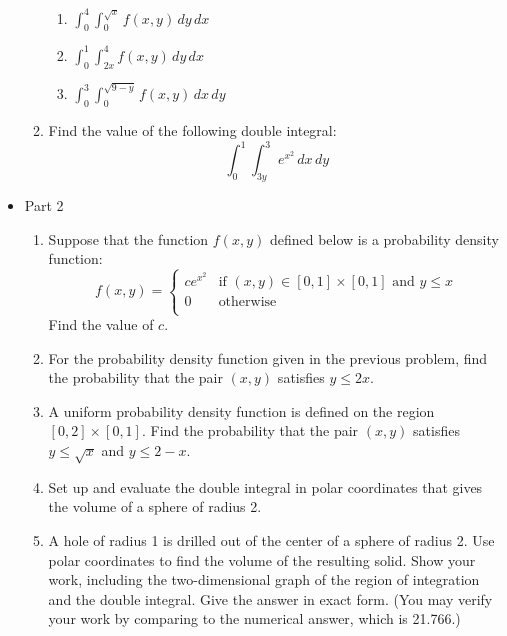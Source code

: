 \documentclass{article}
\begin{document}
\begin{itemize}
\begin{enumerate}
\begin{enumerate}
                     \item $\displaystyle \int_0^4\int_{0}^{\sqrt{x}} f(x,y)\,dy\,dx$
                     \item $\displaystyle \int_0^1\int_{2x}^4 f(x,y)\,dy\,dx$
                    \item $\displaystyle \int_0^3\int_0^{\sqrt{9-y}}f(x,y)\,dx\,dy$
                    \end{enumerate}
                    \item Find the value of the following double integral:
                    $$\int_0^1\int_{3y}^{3}e^{x^2}\,dx\,dy$$
                \end{enumerate} 
            \item Part 2
                \begin{enumerate}
                    \item Suppose that the function $f(x,y)$ defined below is a probability density function:
                    $$ f(x,y) = \begin{cases} 
                        ce^{x^2} & \text{if } (x,y) \in [0,1]\times [0,1] \text{ and } y \leq x\\
                        0 & \text{otherwise} \\
                        \end{cases}
                    $$
                    Find the value of $c$.
                    \item For the probability density function given in the previous problem, find the probability that the pair $(x,y)$ satisfies $y \leq 2x$.
                    \item A uniform probability density function is defined on the region $[0,2]\times[0,1]$. Find the probability that the pair $(x,y)$ satisfies $y \leq \sqrt{x}$ and $y \leq 2-x$.
                    \item Set up and evaluate the double integral in polar coordinates that gives the volume of a sphere of radius 2.

                    \item A hole of radius 1 is drilled out of the center of a sphere of radius 2. Use polar coordinates to find the volume of the resulting solid. Show your work, including the two-dimensional graph of the region of integration and the double integral. Give the answer in exact form. (You may verify your work by comparing to the numerical answer, which is 21.766.)
      

\end{enumerate}
\end{itemize}
\end{document}
